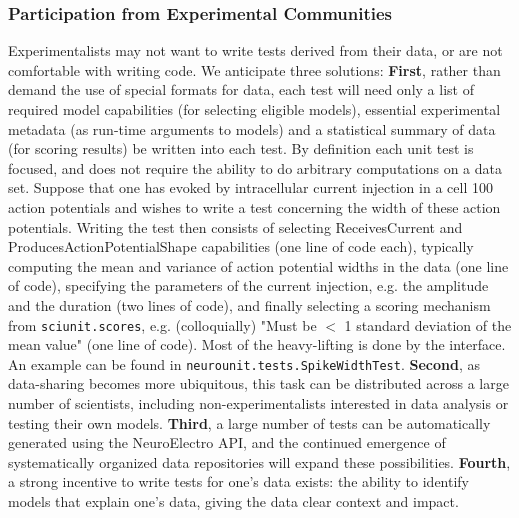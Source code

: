 \documentclass[11pt,letterpaper]{article}
\begin{document}
\subsubsection{Participation from Experimental Communities}
Experimentalists may not want to write tests derived from their data, or are not comfortable with writing code.  We anticipate three solutions: \textbf{First}, rather than demand the use of special formats for data, each test will need only a list of required model capabilities (for selecting eligible models), essential experimental metadata (as run-time arguments to models) and a statistical summary of data (for scoring results) be written into each test.  By definition each unit test is focused, and does not require the ability to do arbitrary computations on a data set.  Suppose that one has evoked by intracellular current injection in a cell 100 action potentials and wishes to write a test concerning the width of these action potentials.  Writing the test then consists of selecting ReceivesCurrent and ProducesActionPotentialShape capabilities (one line of code each), typically computing the mean and variance of action potential widths in the data (one line of code), specifying the parameters of the current injection, e.g. the amplitude and the duration (two lines of code), and finally selecting a scoring mechanism from \verb|sciunit.scores|, e.g. (colloquially) "Must be $<$ 1 standard deviation of the mean value" (one line of code).  Most of the heavy-lifting is done by the interface.  An example can be found in \verb|neurounit.tests.SpikeWidthTest|.  \textbf{Second}, as data-sharing becomes more ubiquitous, this task can be distributed across a large number of scientists, including non-experimentalists interested in data analysis or testing their own models. \textbf{Third}, a large number of tests can be automatically generated using the NeuroElectro API, and the continued emergence of systematically organized data repositories will expand these possibilities. \textbf{Fourth}, a strong incentive to write tests for one's data exists: the ability to identify models that explain one's data, giving the data clear context and impact. 
\end{document}
